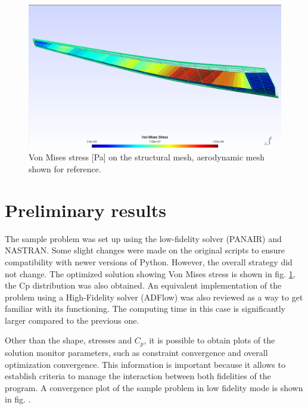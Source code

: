 \begin{figure}[H]
    \centering
    \includegraphics[width=\linewidth]{images/structure_aeromesh.PNG}
    \caption{Von Mises stress [Pa] on the structural mesh, aerodynamic mesh shown for reference.}
    \label{fig:structure_aeromesh}
\end{figure}

\section{Preliminary results}
\label{sec:results}

The sample problem was set up using the low-fidelity solver (PANAIR) and NASTRAN. Some slight changes were made on the original scripts to ensure compatibility with newer versions of Python. However, the overall strategy did not change. The optimized solution showing Von Mises stress is shown in fig. \ref{fig:structure_aeromesh}, the Cp distribution was also obtained. An equivalent implementation of the problem using a High-Fidelity solver (ADFlow) was also reviewed as a way to get familiar with its functioning. The computing time in this case is significantly larger compared to the previous one. \par
Other than the shape, stresses and $C_p$, it is possible to obtain plots of the solution monitor parameters, such as constraint convergence and overall optimization convergence. This information is important because it allows to establish criteria to manage the interaction between both fidelities of the program. A convergence plot of the sample problem in low fidelity mode is shown in fig.  .

